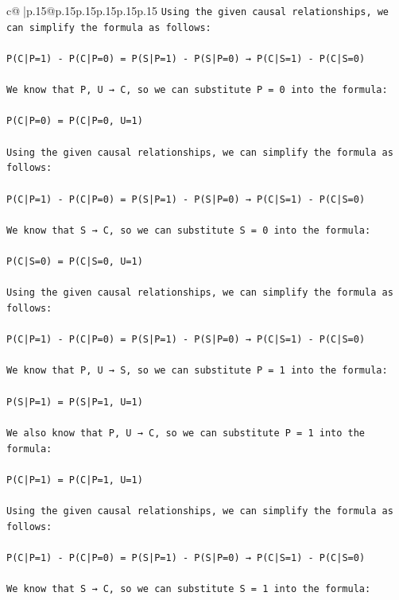 \documentclass{article}
\begin{document}
{\begin{supertabular}{c@{$\;$}|p{.15\linewidth}@{}p{.15\linewidth}p{.15\linewidth}p{.15\linewidth}p{.15\linewidth}p{.15\linewidth}}
{{{\texttt{Using the given causal relationships, we can simplify the formula as follows:} \\
\\ 
\texttt{P(C|P=1) {-} P(C|P=0) = P(S|P=1) {-} P(S|P=0) → P(C|S=1) {-} P(C|S=0)} \\
\\ 
\texttt{We know that P, U → C, so we can substitute P = 0 into the formula:} \\
\\ 
\texttt{P(C|P=0) = P(C|P=0, U=1)} \\
\\ 
\texttt{Using the given causal relationships, we can simplify the formula as follows:} \\
\\ 
\texttt{P(C|P=1) {-} P(C|P=0) = P(S|P=1) {-} P(S|P=0) → P(C|S=1) {-} P(C|S=0)} \\
\\ 
\texttt{We know that S → C, so we can substitute S = 0 into the formula:} \\
\\ 
\texttt{P(C|S=0) = P(C|S=0, U=1)} \\
\\ 
\texttt{Using the given causal relationships, we can simplify the formula as follows:} \\
\\ 
\texttt{P(C|P=1) {-} P(C|P=0) = P(S|P=1) {-} P(S|P=0) → P(C|S=1) {-} P(C|S=0)} \\
\\ 
\texttt{We know that P, U → S, so we can substitute P = 1 into the formula:} \\
\\ 
\texttt{P(S|P=1) = P(S|P=1, U=1)} \\
\\ 
\texttt{We also know that P, U → C, so we can substitute P = 1 into the formula:} \\
\\ 
\texttt{P(C|P=1) = P(C|P=1, U=1)} \\
\\ 
\texttt{Using the given causal relationships, we can simplify the formula as follows:} \\
\\ 
\texttt{P(C|P=1) {-} P(C|P=0) = P(S|P=1) {-} P(S|P=0) → P(C|S=1) {-} P(C|S=0)} \\
\\ 
\texttt{We know that S → C, so we can substitute S = 1 into the formula:} \\
}}}
\end{supertabular}}
\end{document}
